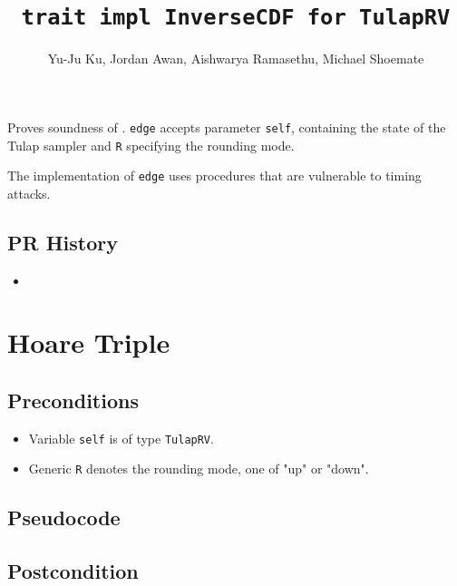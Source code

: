 \documentclass{article}
\title{\texttt{trait impl InverseCDF for TulapRV}}
\author{Yu-Ju Ku, Jordan Awan, Aishwarya Ramasethu, Michael Shoemate}
\begin{document}
\maketitle

\contrib

Proves soundness of .
\texttt{edge} accepts parameter \texttt{self}, containing the state of the Tulap sampler and \texttt{R} specifying the rounding mode.
\floatingPoint

\begin{tcolorbox}
    \begin{warning}
        The implementation of \texttt{edge} uses procedures that are vulnerable to timing attacks. 
    \end{warning}
\end{tcolorbox}

\subsection*{PR History}
\begin{itemize}
    \item {}
\end{itemize}

\section{Hoare Triple}

\subsection*{Preconditions}
\begin{itemize}
    \item Variable \texttt{self} is of type \texttt{TulapRV}.
    \item Generic \texttt{R} denotes the rounding mode, one of "up" or "down".
\end{itemize}

\subsection*{Pseudocode}



\subsection*{Postcondition}
\end{document}
